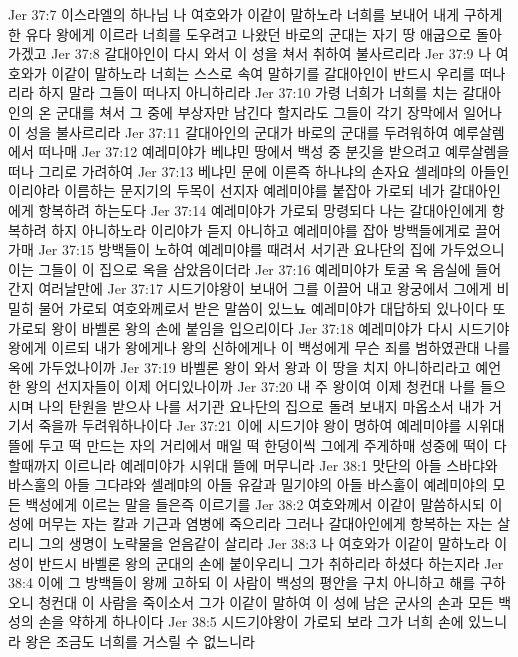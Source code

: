 Jer 37:7  이스라엘의 하나님 나 여호와가 이같이 말하노라 너희를 보내어 내게 구하게 한 유다 왕에게 이르라 너희를 도우려고 나왔던 바로의 군대는 자기 땅 애굽으로 돌아가겠고
Jer 37:8  갈대아인이 다시 와서 이 성을 쳐서 취하여 불사르리라
Jer 37:9  나 여호와가 이같이 말하노라 너희는 스스로 속여 말하기를 갈대아인이 반드시 우리를 떠나리라 하지 말라 그들이 떠나지 아니하리라
Jer 37:10  가령 너희가 너희를 치는 갈대아인의 온 군대를 쳐서 그 중에 부상자만 남긴다 할지라도 그들이 각기 장막에서 일어나 이 성을 불사르리라
Jer 37:11  갈대아인의 군대가 바로의 군대를 두려워하여 예루살렘에서 떠나매
Jer 37:12  예레미야가 베냐민 땅에서 백성 중 분깃을 받으려고 예루살렘을 떠나 그리로 가려하여
Jer 37:13  베냐민 문에 이른즉 하나냐의 손자요 셀레먀의 아들인 이리야라 이름하는 문지기의 두목이 선지자 예레미야를 붙잡아 가로되 네가 갈대아인에게 항복하려 하는도다
Jer 37:14  예레미야가 가로되 망령되다 나는 갈대아인에게 항복하려 하지 아니하노라 이리야가 듣지 아니하고 예레미야를 잡아 방백들에게로 끌어 가매
Jer 37:15  방백들이 노하여 예레미야를 때려서 서기관 요나단의 집에 가두었으니 이는 그들이 이 집으로 옥을 삼았음이더라
Jer 37:16  예레미야가 토굴 옥 음실에 들어간지 여러날만에
Jer 37:17  시드기야왕이 보내어 그를 이끌어 내고 왕궁에서 그에게 비밀히 물어 가로되 여호와께로서 받은 말씀이 있느뇨 예레미야가 대답하되 있나이다 또 가로되 왕이 바벨론 왕의 손에 붙임을 입으리이다
Jer 37:18  예레미야가 다시 시드기야 왕에게 이르되 내가 왕에게나 왕의 신하에게나 이 백성에게 무슨 죄를 범하였관대 나를 옥에 가두었나이까
Jer 37:19  바벨론 왕이 와서 왕과 이 땅을 치지 아니하리라고 예언한 왕의 선지자들이 이제 어디있나이까
Jer 37:20  내 주 왕이여 이제 청컨대 나를 들으시며 나의 탄원을 받으사 나를 서기관 요나단의 집으로 돌려 보내지 마옵소서 내가 거기서 죽을까 두려워하나이다
Jer 37:21  이에 시드기야 왕이 명하여 예레미야를 시위대 뜰에 두고 떡 만드는 자의 거리에서 매일 떡 한덩이씩 그에게 주게하매 성중에 떡이 다할때까지 이르니라 예레미야가 시위대 뜰에 머무니라
Jer 38:1  맛단의 아들 스바댜와 바스훌의 아들 그다랴와 셀레먀의 아들 유갈과 밀기야의 아들 바스훌이 예레미야의 모든 백성에게 이르는 말을 들은즉 이르기를
Jer 38:2  여호와께서 이같이 말씀하시되 이 성에 머무는 자는 칼과 기근과 염병에 죽으리라 그러나 갈대아인에게 항복하는 자는 살리니 그의 생명이 노략물을 얻음같이 살리라
Jer 38:3  나 여호와가 이같이 말하노라 이 성이 반드시 바벨론 왕의 군대의 손에 붙이우리니 그가 취하리라 하셨다 하는지라
Jer 38:4  이에 그 방백들이 왕께 고하되 이 사람이 백성의 평안을 구치 아니하고 해를 구하오니 청컨대 이 사람을 죽이소서 그가 이같이 말하여 이 성에 남은 군사의 손과 모든 백성의 손을 약하게 하나이다
Jer 38:5  시드기야왕이 가로되 보라 그가 너희 손에 있느니라 왕은 조금도 너희를 거스릴 수 없느니라
